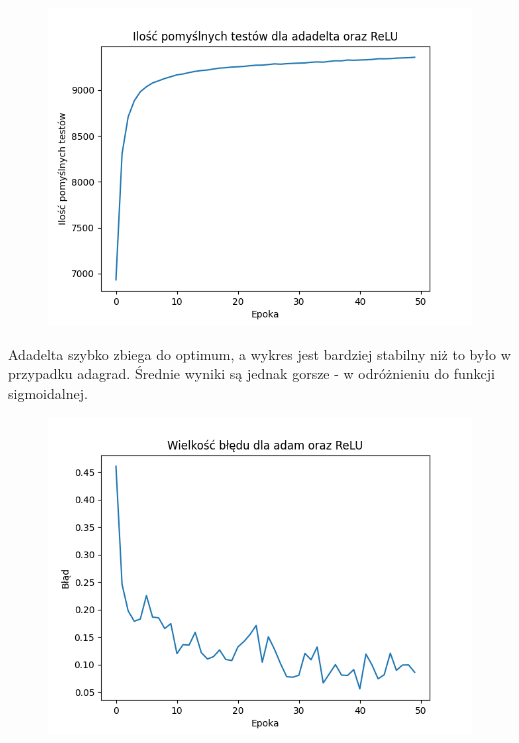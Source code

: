 \documentclass{article}
\begin{document}
\begin{figure}[!htb]
  \centering
  \includegraphics[width=\linewidth]{test_adadelta_ReLU.png}
\end{figure}

Adadelta szybko zbiega do optimum, a wykres jest bardziej stabilny niż to było w przypadku adagrad. Średnie wyniki są jednak gorsze - w odróżnieniu do funkcji sigmoidalnej.

\begin{figure}[!htb]
  \centering
  \includegraphics[width=\linewidth]{error_adam_ReLU.png}
\end{figure}
\end{document}
